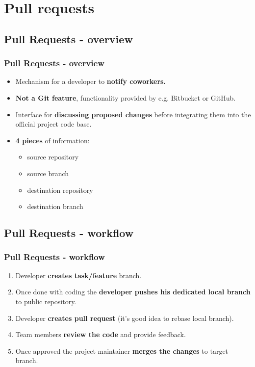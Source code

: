 \section[Pull requests]{Pull requests}
\subsection[]{Pull Requests - overview}
\begin{frame}
\frametitle{Pull Requests - overview}
\begin{itemize}
	\item Mechanism for a developer to \textbf{notify coworkers.}
	\item \textbf{Not a Git feature}, functionality provided by e.g. Bitbucket or GitHub.
	\item Interface for \textbf{discussing proposed changes} before integrating them into the official project code base.
	\item \textbf{4 pieces} of information:
		\begin{itemize} 
		\item source repository
		\item source branch
		\item destination repository
		\item destination branch
		\end{itemize}
\end{itemize}
\end{frame}

\subsection[]{Pull Requests - workflow}
\begin{frame}
\frametitle{Pull Requests - workflow}
\begin{enumerate}
	\item Developer \textbf{creates task/feature} branch.
	\item Once done with coding the \textbf{developer pushes his dedicated local branch} to public repository.
	\item Developer \textbf{creates pull request} (it’s good idea to rebase local branch).
	\item Team members \textbf{review the code} and provide feedback.
	\item Once approved the project maintainer \textbf{merges the changes} to target branch.
\end{enumerate}
\end{frame}


 

